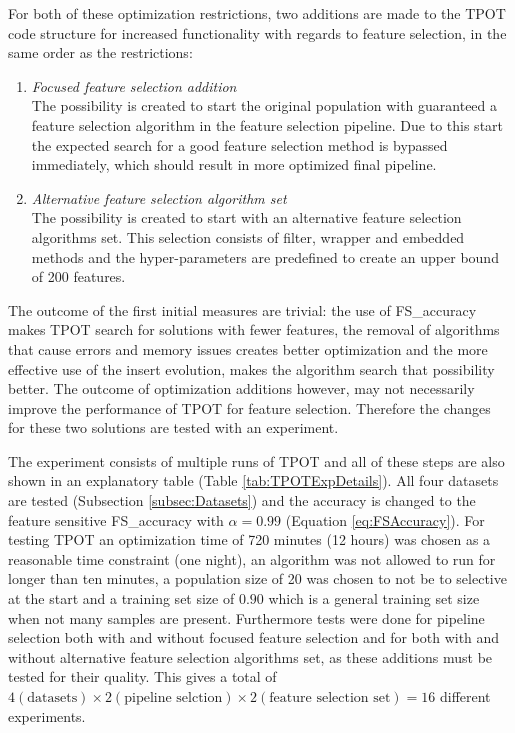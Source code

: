 \documentclass[10pt,a4paper]{article}
\begin{document}
	For both of these optimization restrictions, two additions are made to the TPOT code structure for increased functionality with regards to feature selection, in the same order as the restrictions:
	
	\begin{enumerate}
		\item \textit{Focused feature selection addition} \\
		The possibility is created to start the original population with guaranteed a feature selection algorithm in the feature selection pipeline. Due to this start the expected search for a good feature selection method is bypassed immediately, which should result in more optimized final pipeline.
		\item \textit{Alternative feature selection algorithm set} \\
		The possibility is created to start with an alternative feature selection algorithms set. This selection consists of filter, wrapper and embedded methods and the hyper-parameters are predefined to create an upper bound of 200 features.
	\end{enumerate}
	
	The outcome of the first initial measures are trivial: the use of FS\_accuracy makes TPOT search for solutions with fewer features, the removal of algorithms that cause errors and memory issues creates better optimization and the more effective use of the insert evolution, makes the algorithm search that possibility better. The outcome of optimization additions however, may not necessarily improve the performance of TPOT for feature selection. Therefore the changes for these two solutions are tested with an experiment. 
	
	The experiment consists of multiple runs of TPOT and all of these steps are also shown in an explanatory table (Table \ref{tab:TPOTExpDetails}). All four datasets are tested (Subsection \ref{subsec:Datasets}) and the accuracy is changed to the feature sensitive FS\_accuracy with $\alpha = 0.99$ (Equation \ref{eq:FSAccuracy}). For testing TPOT an optimization time of 720 minutes (12 hours) was chosen as a reasonable time constraint (one night), an algorithm was not allowed to run for longer than ten minutes, a population size of 20 was chosen to not be to selective at the start and a training set size of $0.90$ which is a general training set size when not many samples are present. Furthermore tests were done for pipeline selection both with and without focused feature selection  and for both with and without alternative feature selection algorithms set, as these additions must be tested for their quality. This gives a total of $4 (\text{datasets}) \times 2 (\text{pipeline selction}) \times 2 (\text{feature selection set}) = 16$ different experiments.
	
\end{document}
